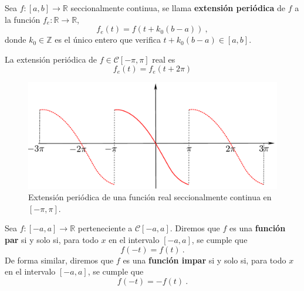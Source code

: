 \begin{defi}
Sea $f: [a,b] \rightarrow \mathbb{R}$ seccionalmente continua, se llama \textbf{extensión periódica} de $f$ a la función $f_e: \mathbb{R} \rightarrow \mathbb{R}$,
\begin{equation} 
    \boxed{f_e(t) = f(t + k_0 (b-a))} \ , 
\end{equation}
donde $k_0 \in \mathbb{Z}$ es el único entero que verifica $t + k_0(b-a) \in [a,b].$
\end{defi}

\begin{ejemplo}
La extensión periódica de $f \in \mathscr{C}[-\pi,\pi]$ real es
$$f_e(t) = f_e(t + 2\pi)$$

\begin{figure}[H]
    \centering
    \includegraphics[scale = 0.45]{Figuras/Periocidad.pdf}
    \caption{Extensión periódica de una función real seccionalmente continua en $[-\pi,\pi]$.}
\end{figure}
\end{ejemplo}

 
\begin{defi} 
Sea $f: [-a,a] \longrightarrow \mathbb{R}$ perteneciente a $\mathscr{C}[-a,a]$.
Diremos que $f$ es una \textbf{función par} si y solo si, para todo $x$ en el intervalo $[-a,a]$, se cumple que
\begin{equation}
    f(-t) = f(t) \ .
\end{equation}
De forma similar, diremos que $f$ es una \textbf{función impar} si y solo si, para todo $x$ en el intervalo $[-a,a]$, se cumple que
\vspace{-0.1cm}
\begin{equation}
     f(-t) = -f(t) \ .
\end{equation}
\end{defi} 

